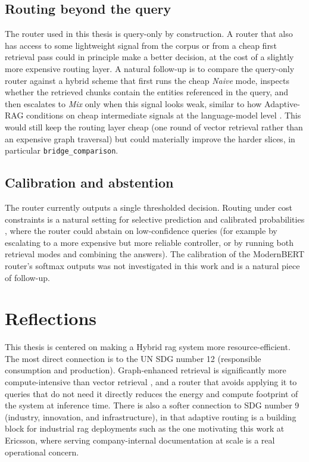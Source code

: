 \documentclass[english, bibtex]{kththesis}               %
\numberwithin{listing}{chapter}
\begin{document}
\subsection{Routing beyond the query}
\label{sec:limitRouting}

The router used in this thesis is query-only by construction. A router that also has access to some lightweight signal from the corpus or from a cheap first retrieval pass could in principle make a better decision, at the cost of a slightly more expensive routing layer. A natural follow-up is to compare the query-only router against a hybrid scheme that first runs the cheap \emph{Naive} mode, inspects whether the retrieved chunks contain the entities referenced in the query, and then escalates to \emph{Mix} only when this signal looks weak, similar to how Adaptive-RAG conditions on cheap intermediate signals at the language-model level \cite{jeong2024adaptiverag}. This would still keep the routing layer cheap (one round of vector retrieval rather than an expensive graph traversal) but could materially improve the harder slices, in particular \texttt{bridge\_comparison}.

\subsection{Calibration and abstention}
\label{sec:limitCalibration}

The router currently outputs a single thresholded decision. Routing under cost constraints is a natural setting for selective prediction \cite{geifman2017selective} and calibrated probabilities \cite{guo2017calibration}, where the router could abstain on low-confidence queries (for example by escalating to a more expensive but more reliable controller, or by running both retrieval modes and combining the answers). The calibration of the ModernBERT router's softmax outputs was not investigated in this work and is a natural piece of follow-up.

\section{Reflections}
\label{sec:reflections}

This thesis is centered on making a Hybrid \gls{rag} system more resource-efficient. The most direct connection is to the \gls{UN} \gls{SDG} number 12 (responsible consumption and production). Graph-enhanced retrieval is significantly more compute-intensive than vector retrieval \cite{lightrag2024,microsoft2024graphragcosts}, and a router that avoids applying it to queries that do not need it directly reduces the energy and compute footprint of the system at inference time. There is also a softer connection to \gls{SDG} number 9 (industry, innovation, and infrastructure), in that adaptive routing is a building block for industrial \gls{rag} deployments such as the one motivating this work at Ericsson, where serving company-internal documentation at scale is a real operational concern.
\end{document}
